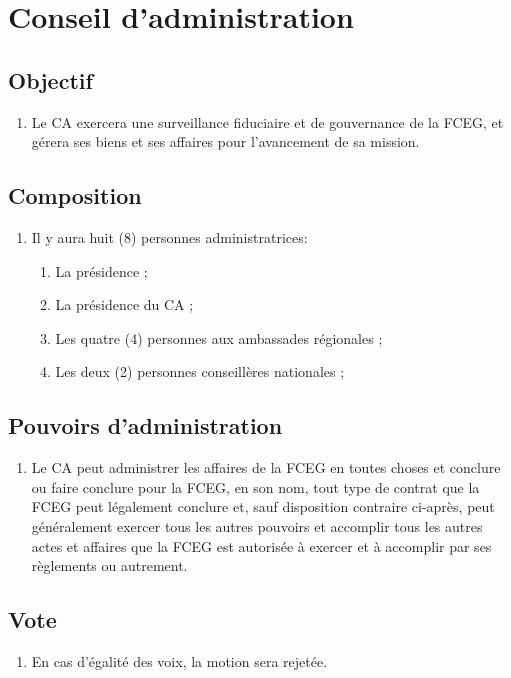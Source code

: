 \section{Conseil d'administration}
\label{conseil-d-administration}

\subsection{Objectif}
\label{conseil-d-administration-objectif}

\begin{enumerate}
 \item Le CA exercera une surveillance fiduciaire et de gouvernance de la FCEG, et gérera ses biens et ses affaires pour l'avancement de sa mission.
\end{enumerate}

\subsection{Composition}
\label{conseil-d-administration-composition}

\begin{enumerate}
 \item Il y aura huit (8) personnes administratrices:
  \begin{enumerate}
   \item La présidence ;
   \item La présidence du CA ;
   \item Les quatre (4) personnes aux ambassades régionales ;
   \item Les deux (2) personnes conseillères nationales ;
  \end{enumerate}
\end{enumerate}

\subsection{Pouvoirs d'administration}
\label{conseil-d-administration-pouvoirs-d-administration}

\begin{enumerate}
 \item Le CA peut administrer les affaires de la FCEG en toutes choses et conclure ou faire conclure pour la FCEG, en son nom, tout type de contrat que la FCEG peut légalement conclure et, sauf disposition contraire ci-après, peut généralement exercer tous les autres pouvoirs et accomplir tous les autres actes et affaires que la FCEG est autorisée à exercer et à accomplir par ses règlements ou autrement.
\end{enumerate}

\subsection{Vote}
\label{conseil-d-administration-vote}

\begin{enumerate}
 \item En cas d'égalité des voix, la motion sera rejetée.
\end{enumerate}
